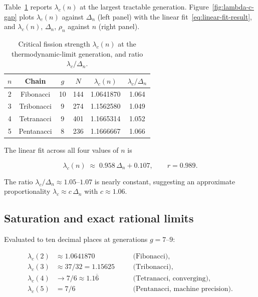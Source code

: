 \documentclass[11pt]{article}
\newcommand{\lc}{\lambda_c}
\newcommand{\rhon}{\rho_n}
\begin{document}
Table~\ref{tab:lc} reports $\lc(n)$ at the largest tractable generation.
Figure~\ref{fig:lambda-c-gap} plots $\lc(n)$ against $\Delta_n$ (left
panel) with the linear fit~\eqref{eq:linear-fit-result}, and $\lc(n)$,
$\Delta_n$, $\rhon$ against $n$ (right panel).

\begin{table}[h]
\centering
\caption{Critical fission strength $\lc(n)$ at the thermodynamic-limit
         generation, and ratio $\lc/\Delta_n$.}
\label{tab:lc}
\begin{tabular}{cccccc}
\toprule
$n$ & Chain & $g$ & $N$ & $\lc(n)$ & $\lc/\Delta_n$ \\
\midrule
2 & Fibonacci   & 10 & 144 & 1.0641870 & 1.064 \\
3 & Tribonacci  &  9 & 274 & 1.1562580 & 1.049 \\
4 & Tetranacci  &  9 & 401 & 1.1665314 & 1.052 \\
5 & Pentanacci  &  8 & 236 & 1.1666667 & 1.066 \\
\bottomrule
\end{tabular}
\end{table}

The linear fit across all four values of $n$ is

\begin{equation}
  \lc(n) \;\approx\; 0.958\,\Delta_n + 0.107,
  \qquad r = 0.989.
  \label{eq:linear-fit-result}
\end{equation}

The ratio $\lc/\Delta_n \approx 1.05$--$1.07$ is nearly constant,
suggesting an approximate proportionality $\lc \approx c\,\Delta_n$
with $c \approx 1.06$.

\subsection{Saturation and exact rational limits}
\label{sec:saturation}

Evaluated to ten decimal places at generations $g = 7$--$9$:

\begin{align}
  \lc(2) &\approx 1.0641870 && \text{(Fibonacci)}, \label{eq:lc2}\\
  \lc(3) &\approx 37/32 = 1.15625\phantom{00} && \text{(Tribonacci)}, \label{eq:lc3}\\
  \lc(4) &\to 7/6 \approx 1.1\overline{6}\phantom{000} && \text{(Tetranacci, converging)}, \label{eq:lc4}\\
  \lc(5) &= 7/6 && \text{(Pentanacci, machine precision)}. \label{eq:lc5}
\end{align}
\end{document}
